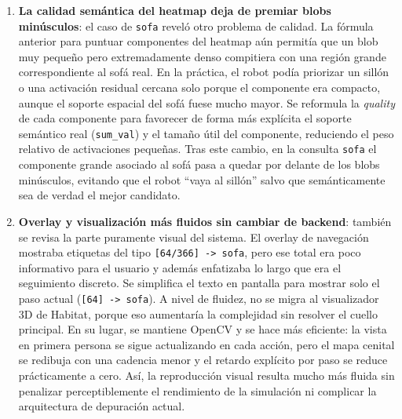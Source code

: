 \documentclass[11pt,a4paper]{article}
\begin{document}
\begin{enumerate}
  \item \textbf{La calidad semántica del heatmap deja de premiar blobs
        minúsculos}: el caso de \texttt{sofa} reveló otro problema de calidad.
        La fórmula anterior para puntuar componentes del heatmap aún permitía
        que un blob muy pequeño pero extremadamente denso compitiera con una
        región grande correspondiente al sofá real. En la práctica, el robot
        podía priorizar un sillón o una activación residual cercana solo porque
        el componente era compacto, aunque el soporte espacial del sofá fuese
        mucho mayor. Se reformula la \textit{quality} de cada componente para
        favorecer de forma más explícita el soporte semántico real
        (\texttt{sum\_val}) y el tamaño útil del componente, reduciendo el peso
        relativo de activaciones pequeñas. Tras este cambio, en la consulta
        \texttt{sofa} el componente grande asociado al sofá pasa a quedar por
        delante de los blobs minúsculos, evitando que el robot ``vaya al
        sillón'' salvo que semánticamente sea de verdad el mejor candidato.

  \item \textbf{Overlay y visualización más fluidos sin cambiar de backend}:
        también se revisa la parte puramente visual del sistema. El overlay de
        navegación mostraba etiquetas del tipo \texttt{[64/366] -> sofa}, pero
        ese total era poco informativo para el usuario y además enfatizaba lo
        largo que era el seguimiento discreto. Se simplifica el texto en
        pantalla para mostrar solo el paso actual (\texttt{[64] -> sofa}). A
        nivel de fluidez, no se migra al visualizador 3D de Habitat, porque
        eso aumentaría la complejidad sin resolver el cuello principal. En su
        lugar, se mantiene OpenCV y se hace más eficiente: la vista en primera
        persona se sigue actualizando en cada acción, pero el mapa cenital se
        redibuja con una cadencia menor y el retardo explícito por paso se
        reduce prácticamente a cero. Así, la reproducción visual resulta mucho
        más fluida sin penalizar perceptiblemente el rendimiento de la
        simulación ni complicar la arquitectura de depuración actual.


\end{enumerate}
\end{document}
